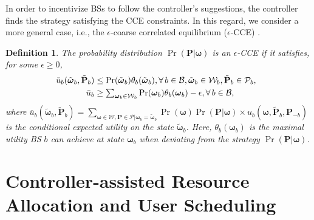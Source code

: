 \documentclass[conference]{IEEEtran}
\newtheorem{definition}{Definition}
\newtheorem{remark}{Remark}
\begin{document}
In order to incentivize BSs to follow the controller's suggestions, the controller finds the strategy satisfying the CCE constraints.  In this regard, we consider a more general case, i.e., the $\epsilon$-coarse correlated equilibrium ($\epsilon$-CCE) \cite{jnl:perlaza13}.
%
%
%
\begin{definition}\label{Def: epsilon-CCE}
The probability distribution $\Pr(\mathbf{P}|\boldsymbol{\omega})$  is an $\epsilon$-CCE if  it satisfies, for some $\epsilon\geq 0$,
\begin{align}
%
\hspace{-0.6em}\bar{u}_b(\tilde{\boldsymbol{\omega}}_b,\tilde{\mathbf{P}}_b)&\leq \Pr(\tilde{\boldsymbol{\omega}}_b)\theta_b( \tilde{\boldsymbol{\omega}}_b) ,\forall\,b\in\mathcal{B},\tilde{\boldsymbol{\omega}}_b\in\mathcal{W}_b, \tilde{\mathbf{P}}_b\in\mathcal{P}_b ,\label{Eq: CCE-1} \\
%
\textstyle\bar{u}_b&\geq
 \textstyle\sum_{ \boldsymbol{\omega}_b\in\mathcal{W}_b} \Pr( \boldsymbol{\omega}_b)\theta_b( \boldsymbol{\omega}_b)-\epsilon,\forall\,b\in\mathcal{B},\label{Eq: CCE-2}
\end{align}
%
where $\bar{u}_b(\tilde{\boldsymbol{\omega}}_b,\tilde{\mathbf{P}}_b)=\sum_{\boldsymbol{\omega}\in\mathcal{W},\mathbf{P}\in\mathcal{P}|\boldsymbol{\omega}_b=\tilde{\boldsymbol{\omega}}_b}  \Pr(\boldsymbol{\omega})\Pr(\mathbf{P}|  \boldsymbol{\omega})\allowbreak\times u_b(\boldsymbol{\omega},\tilde{\mathbf{P}}_b, \mathbf{P}_{-b})$ is the conditional expected utility on the state $\tilde{\boldsymbol{\omega}}_b$.
Here, $\theta_{b}( \boldsymbol{\omega}_{b})$ is the maximal utility  BS $b$ can achieve at  state $\boldsymbol{\omega}_{b}$ when deviating from the strategy $\Pr(\mathbf{P}|  \boldsymbol{\omega})$.
\end{definition}
%
%
%
%
%
%
%
%
%






\section{Controller-assisted  Resource Allocation and User Scheduling}\label{Sec: Two-timescale control}
\end{document}
